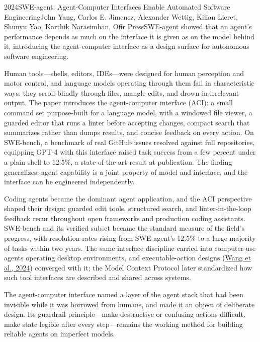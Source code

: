 
\begin{papersummary}{2024}{SWE-agent: Agent-Computer Interfaces Enable Automated Software Engineering}{John Yang, Carlos E. Jimenez, Alexander Wettig, Kilian Lieret, Shunyu Yao, Karthik Narasimhan, Ofir Press}{SWE-agent showed that an agent's performance depends as much on the interface it is given as on the model behind it, introducing the agent-computer interface as a design surface for autonomous software engineering.}

Human tools---shells, editors, IDEs---were designed for human perception and motor control, and language models operating through them fail in characteristic ways: they scroll blindly through files, mangle edits, and drown in irrelevant output. The paper introduces the agent-computer interface (ACI): a small command set purpose-built for a language model, with a windowed file viewer, a guarded editor that runs a linter before accepting changes, compact search that summarizes rather than dumps results, and concise feedback on every action. On SWE-bench, a benchmark of real GitHub issues resolved against full repositories, equipping GPT-4 with this interface raised task success from a few percent under a plain shell to 12.5\%, a state-of-the-art result at publication. The finding generalizes: agent capability is a joint property of model and interface, and the interface can be engineered independently.

Coding agents became the dominant agent application, and the ACI perspective shaped their design: guarded edit tools, structured search, and linter-in-the-loop feedback recur throughout open frameworks and production coding assistants. SWE-bench and its verified subset became the standard measure of the field's progress, with resolution rates rising from SWE-agent's 12.5\% to a large majority of tasks within two years. The same interface discipline carried into computer-use agents operating desktop environments, and executable-action designs (\hyperref[paper:wang-2024]{Wang et al., 2024}) converged with it; the Model Context Protocol later standardized how such tool interfaces are described and shared across systems.

The agent-computer interface named a layer of the agent stack that had been invisible while it was borrowed from humans, and made it an object of deliberate design. Its guardrail principle---make destructive or confusing actions difficult, make state legible after every step---remains the working method for building reliable agents on imperfect models.

\end{papersummary}
